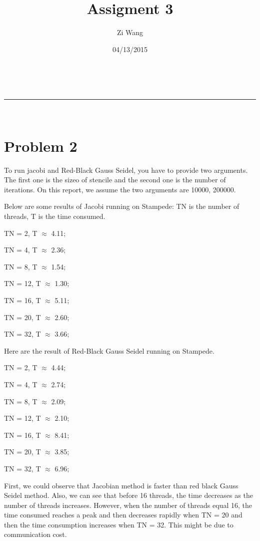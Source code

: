 \documentclass[a4paper,11pt]{article}
\makeatletter
\newcommand{\linia}{\rule{\linewidth}{0.5pt}}
\theoremstyle{mytheor}
\theoremstyle{mytheor}
\renewcommand{\maketitle}{
\begin{center}
\vspace{2ex}
{\huge \textsc{\@title}}
\vspace{1ex}
\\
\linia\\
\@author \hfill \@date
\vspace{4ex}
\end{center}
}
\makeatother
\begin{document}
\title{Assigment 3}

\author{Zi Wang}

\date{04/13/2015}

\maketitle

\section{Problem 2}
To run jacobi and Red-Black Gauss Seidel, you have to provide two arguments. The first one is the sizeo of stencile and the second one is the number of iterations. On this report, we assume the two arguments are 10000, 200000.

Below are some results of Jacobi running on Stampede: TN is the number of threads, T is the time consumed.

TN = 2, T $\approx$ 4.11;

TN = 4, T $\approx$ 2.36;

TN = 8, T $\approx$ 1.54;

TN = 12, T $\approx$ 1.30;

TN = 16, T $\approx$ 5.11;

TN = 20, T $\approx$ 2.60;

TN = 32, T $\approx$ 3.66;


Here are the result of Red-Black Gauss Seidel running on Stampede.

TN = 2, T $\approx$ 4.44;

TN = 4, T $\approx$ 2.74;

TN = 8, T $\approx$ 2.09;

TN = 12, T $\approx$ 2.10;

TN = 16, T $\approx$ 8.41;

TN = 20, T $\approx$ 3.85;

TN = 32, T $\approx$ 6.96;

First, we could observe that Jacobian method is faster than red black Gauss Seidel method. Also, we can see that before 16 threads, the time decreases as the number of threads increases. However, when the number of threads equal 16, the time consumed reaches a peak and then decreases rapidly when TN = 20 and then the time consumption increases when TN = 32. This might be due to communication cost.
\end{document}
